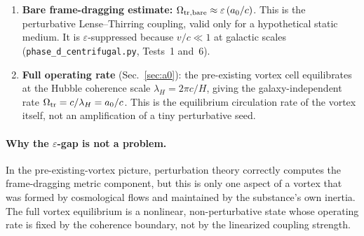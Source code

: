 \documentclass[11pt]{article}
\begin{document}
\begin{enumerate}
\item \textbf{Bare frame-dragging estimate:}
  $\Omega_{\rm tr,bare}\approx\varepsilon\,(a_0/c)$.
  This is the perturbative Lense--Thirring coupling, valid only for
  a hypothetical static medium.  It is $\varepsilon$-suppressed
  because $v/c\ll 1$ at galactic scales
  (\texttt{phase\_d\_centrifugal.py}, Tests~1 and~6).

\item \textbf{Full operating rate} (Sec.~\ref{sec:a0}):
  the pre-existing vortex cell equilibrates at the Hubble coherence
  scale $\lambda_H=2\pi c/H$, giving the galaxy-independent rate
  $\Omega_{\rm tr}=c/\lambda_H=a_0/c$.
  This is the equilibrium circulation rate of the vortex itself, not
  an amplification of a tiny perturbative seed.
\end{enumerate}

\paragraph{Why the $\varepsilon$-gap is not a problem.}
In the pre-existing-vortex picture, perturbation theory correctly
computes the frame-dragging metric component, but this is only one
aspect of a vortex that was formed by cosmological flows and
maintained by the substance's own inertia.  The full vortex
equilibrium is a nonlinear, non-perturbative state whose operating
rate is fixed by the coherence boundary, not by the linearized
coupling strength.
\end{document}
